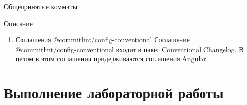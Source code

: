 \documentclass[
  ignorenonframetext,
  aspectratio=169,
  russian,
]{beamer}
\providecommand{\tightlist}{%
  \setlength{\itemsep}{0pt}\setlength{\parskip}{0pt}}
\begin{document}
\begin{frame}[fragile]{Общепринятые коммиты}
\begin{block}{Описание}
\begin{itemize}[<+->]
\begin{enumerate}[<+->]
\begin{enumerate}[<+->]
      \begin{itemize}[<+->]
      \tightlist
      \item
        \texttt{packaging} --- используется для изменений, которые
        изменяют структуру пакета, например, изменения общедоступного
        пути.
      \item
        \texttt{changelog} --- используется для обновления примечаний к
        выпуску в CHANGELOG.md.
      \item
        отсутствует область действия --- полезно для изменений стиля,
        тестирования и рефакторинга, которые выполняются во всех пакетах
        (например, style: добавить отсутствующие точки с запятой).
      \end{itemize}
    \item
      Соглашения @commitlint/config-conventional Соглашение
      @commitlint/config-conventional входит в пакет Conventional
      Changelog. В целом в этом соглашении придерживаются соглашения
      Angular.
    \end{enumerate}
  \end{enumerate}
\end{itemize}
\end{block}
\end{frame}

\section{Выполнение лабораторной
работы}\label{ux432ux44bux43fux43eux43bux43dux435ux43dux438ux435-ux43bux430ux431ux43eux440ux430ux442ux43eux440ux43dux43eux439-ux440ux430ux431ux43eux442ux44b}
\end{document}

